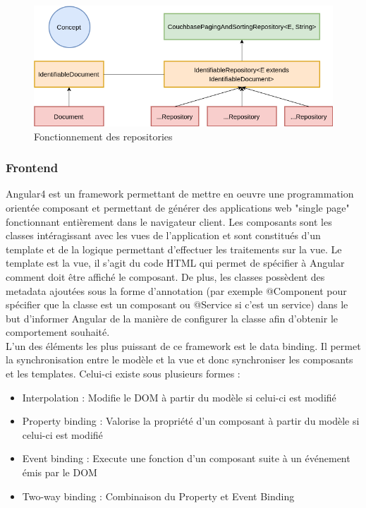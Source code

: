 \begin{figure}[h!]
	\includegraphics[scale=0.55]{images/travailBP1818/piecesJustif/repository.png}
	\centering
	\caption{Fonctionnement des repositories}
	\label{repository}
\end{figure}

\subsubsection{Frontend}
\label{frontendArchi}

	Angular4 est un framework permettant de mettre en oeuvre une programmation orientée composant et permettant de générer des applications web "single page" fonctionnant entièrement dans le navigateur client. Les composants sont les classes intéragissant avec les vues de l'application et sont constitués d'un template et de la logique permettant d'effectuer les traitements sur la vue. Le template est la vue, il s'agit du code HTML qui permet de spécifier à Angular comment doit être affiché le composant. De plus, les classes possèdent des metadata ajoutées sous la forme d'annotation (par exemple @Component pour spécifier que la classe est un composant ou @Service si c'est un service) dans le but d'informer Angular de la manière de configurer la classe afin d'obtenir le comportement souhaité. \\
	
	L'un des éléments les plus puissant de ce framework est le data binding. Il permet la synchronisation entre le modèle et la vue et donc synchroniser les composants et les templates. Celui-ci existe sous plusieurs formes :
	\begin{itemize}
		\item Interpolation : Modifie le DOM à partir du modèle si celui-ci est modifié
		\item Property binding : Valorise la propriété d'un composant à partir du modèle si celui-ci est modifié
		\item Event binding : Execute une fonction d'un composant suite à un événement émis par le DOM
		\item Two-way binding : Combinaison du Property et Event Binding \\
	\end{itemize}

